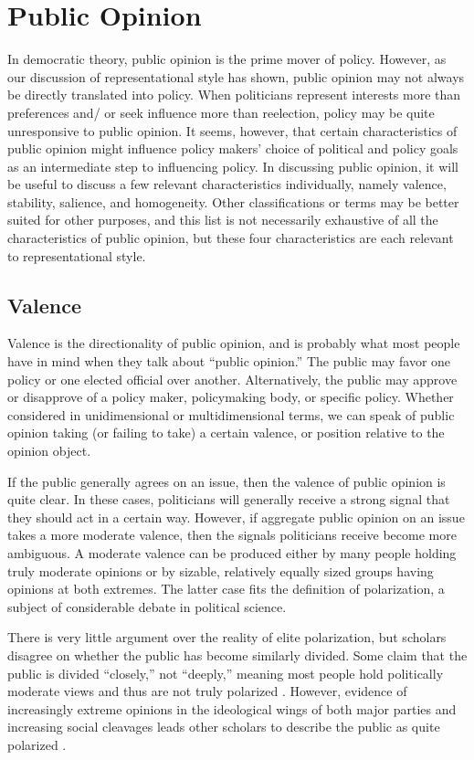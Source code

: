 \section*{Public Opinion}

In democratic theory, public opinion is the prime mover of policy. However, as our discussion of representational style has shown, public opinion may not always be directly translated into policy. When politicians represent interests more than preferences and/ or seek influence more than reelection, policy may be quite unresponsive to public opinion. It seems, however, that certain characteristics of public opinion might influence policy makers' choice of political and policy goals as an intermediate step to influencing policy. In discussing public opinion, it will be useful to discuss a few relevant characteristics individually, namely valence, stability, salience, and homogeneity. Other classifications or terms may be better suited for other purposes, and this list is not necessarily exhaustive of all the characteristics of public opinion, but these four characteristics are each relevant to representational style.

\subsection*{Valence}
Valence is the directionality of public opinion, and is probably what most people have in mind when they talk about ``public opinion.'' The public may favor one policy or one elected official over another. Alternatively, the public may approve or disapprove of a policy maker, policymaking body, or specific policy. Whether considered in unidimensional or multidimensional terms, we can speak of public opinion taking (or failing to take) a certain valence, or position relative to the opinion object.

If the public generally agrees on an issue, then the valence of public opinion is quite clear. In these cases, politicians will generally receive a strong signal that they should act in a certain way. However, if aggregate public opinion on an issue takes a more moderate valence, then the signals politicians receive become more ambiguous. A moderate valence can be produced either by many people holding truly moderate opinions or by sizable, relatively equally sized groups having opinions at both extremes. The latter case fits the definition of polarization, a subject of considerable debate in political science.

There is very little argument over the reality of elite polarization, but scholars disagree on whether the public has become similarly divided. Some claim that the public is divided ``closely,'' not ``deeply,'' meaning most people hold politically moderate views and thus are not truly polarized \citep{Fiorina2006,Fiorina2008}. However, evidence of increasingly extreme opinions in the ideological wings of both major parties and increasing social cleavages leads other scholars to describe the public as quite polarized \citep{Abramowitz2008}.

